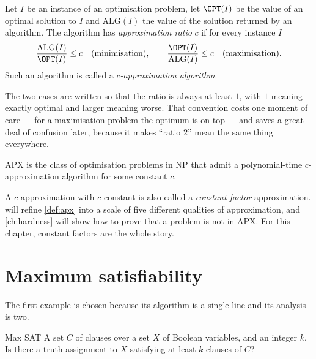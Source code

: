 \begin{definition}\label{def:approx-ratio}
Let $I$ be an instance of an optimisation problem, let $\OPT(I)$ be the value
of an optimal solution to $I$ and $\mathrm{ALG}(I)$ the value of the solution
returned by an algorithm. The algorithm has \emph{approximation ratio} $c$ if
for every instance $I$
\[
  \frac{\mathrm{ALG}(I)}{\OPT(I)} \le c \quad\text{(minimisation)},
  \qquad
  \frac{\OPT(I)}{\mathrm{ALG}(I)} \le c \quad\text{(maximisation)}.
\]
Such an algorithm is called a \emph{$c$-approximation algorithm}.
\end{definition}

The two cases are written so that the ratio is always at least $1$, with $1$
meaning exactly optimal and larger meaning worse. That convention costs one
moment of care --- for a maximisation problem the optimum is on top --- and
saves a great deal of confusion later, because it makes ``ratio $2$'' mean the
same thing everywhere.

\begin{definition}[APX]\label{def:apx}
\textrm{APX} is the class of optimisation problems in \textrm{NP} that admit a
polynomial-time $c$-approximation algorithm for some constant $c$.
\end{definition}

A $c$-approximation with $c$ constant is also called a \emph{constant factor}
approximation.  will refine \cref{def:apx} into a scale of
five different qualities of approximation, and \cref{ch:hardness} will show how
to prove that a problem is not in \textrm{APX}. For this chapter, constant
factors are the whole story.

\section{Maximum satisfiability}
\label{sec:max-sat}

The first example is chosen because its algorithm is a single line and its
analysis is two.

\begin{probdef}{Max SAT}
  \instance A set $C$ of clauses over a set $X$ of Boolean variables, and an
  integer $k$.
  \question Is there a truth assignment to $X$ satisfying at least $k$ clauses
  of $C$?
\end{probdef}

